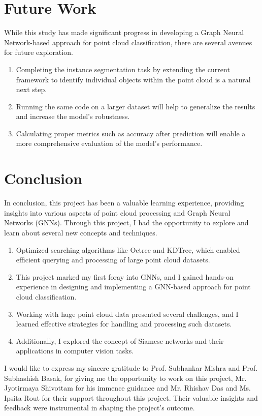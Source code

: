 \section{Future Work}

While this study has made significant progress in developing a Graph Neural Network-based approach for point cloud classification, there are several avenues for future exploration.

\begin{enumerate}
\item Completing the instance segmentation task by extending the current framework to identify individual objects within the point cloud is a natural next step.
\item Running the same code on a larger dataset will help to generalize the results and increase the model's robustness.
\item Calculating proper metrics such as accuracy after prediction will enable a more comprehensive evaluation of the model's performance.
\end{enumerate}

\section{Conclusion}
In conclusion, this project has been a valuable learning experience, providing insights into various aspects of point cloud processing and Graph Neural Networks (GNNs). Through this project, I had the opportunity to explore and learn about several new concepts and techniques.

\begin{enumerate}
\item Optimized searching algorithms like Octree and KDTree, which enabled efficient querying and processing of large point cloud datasets.
\item This project marked my first foray into GNNs, and I gained hands-on experience in designing and implementing a GNN-based approach for point cloud classification.
\item Working with huge point cloud data presented several challenges, and I learned effective strategies for handling and processing such datasets.
\item Additionally, I explored the concept of Siamese networks and their applications in computer vision tasks.
\end{enumerate}

I would like to express my sincere gratitude to Prof. Subhankar Mishra and Prof. Subhashish Basak, for giving me the opportunity to work on this project, Mr. Jyotirmaya Shivottam for his immence guidance and Mr. Rhishav Das and Ms. Ipsita Rout for their support throughout this project. Their valuable insights and feedback were instrumental in shaping the project's outcome.